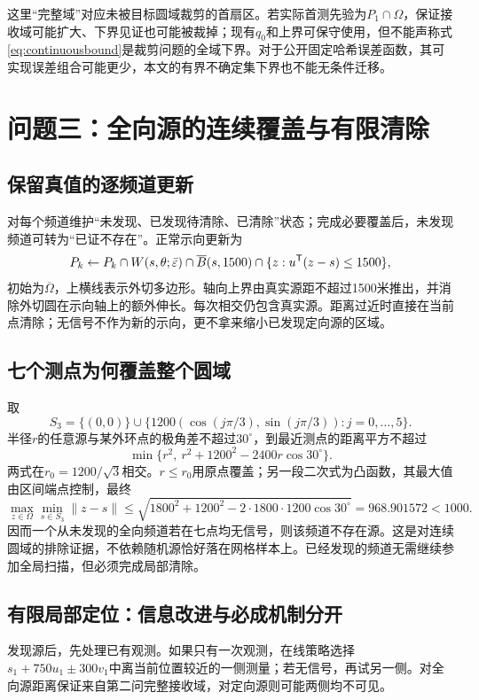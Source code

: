 \documentclass[UTF8,a4paper,zihao=-4,fontset=mac]{ctexart}
\begin{document}
这里“完整域”对应未被目标圆域裁剪的首扇区。若实际首测先验为$P_1\cap\Omega$，保证接收域可能扩大、下界见证也可能被裁掉；现有$q_0$和上界可保守使用，但不能声称式\eqref{eq:continuousbound}是裁剪问题的全域下界。对于公开固定哈希误差函数，其可实现误差组合可能更少，本文的有界不确定集下界也不能无条件迁移。

\section{问题三：全向源的连续覆盖与有限清除}
\subsection{保留真值的逐频道更新}
对每个频道维护“未发现、已发现待清除、已清除”状态；完成必要覆盖后，未发现频道可转为“已证不存在”。正常示向更新为
\begin{equation}\label{eq:update}
P_k\leftarrow P_k\cap W(s,\theta;\bar\varepsilon)\cap\overline B(s,1500)
\cap\{z:u^\mathsf T(z-s)\le1500\},
\end{equation}
初始为$\overline\Omega$，上横线表示外切多边形。轴向上界由真实源距不超过1500米推出，并消除外切圆在示向轴上的额外伸长。每次相交仍包含真实源。距离过近时直接在当前点清除；无信号不作为新的示向，更不拿来缩小已发现定向源的区域。

\subsection{七个测点为何覆盖整个圆域}
取
\begin{equation}
S_3=\{(0,0)\}\cup\{1200(\cos(j\pi/3),\sin(j\pi/3)):j=0,\ldots,5\}.
\end{equation}
半径$r$的任意源与某外环点的极角差不超过$30^\circ$，到最近测点的距离平方不超过
\begin{equation}
\min\{r^2,\ r^2+1200^2-2400r\cos30^\circ\}.
\end{equation}
两式在$r_0=1200/\sqrt3$相交。$r\le r_0$用原点覆盖；另一段二次式为凸函数，其最大值由区间端点控制，最终
\begin{equation}\label{eq:seven}
\max_{z\in\Omega}\min_{s\in S_3}\|z-s\|
\le\sqrt{1800^2+1200^2-2\cdot1800\cdot1200\cos30^\circ}
=968.901572<1000.
\end{equation}
因而一个从未发现的全向频道若在七点均无信号，则该频道不存在源。这是对连续圆域的排除证据，不依赖随机源恰好落在网格样本上。已经发现的频道无需继续参加全局扫描，但必须完成局部清除。

\subsection{有限局部定位：信息改进与必成机制分开}
发现源后，先处理已有观测。如果只有一次观测，在线策略选择$s_1+750u_1\pm300v_1$中离当前位置较近的一侧测量；若无信号，再试另一侧。对全向源距离保证来自第二问完整接收域，对定向源则可能两侧均不可见。
\end{document}
